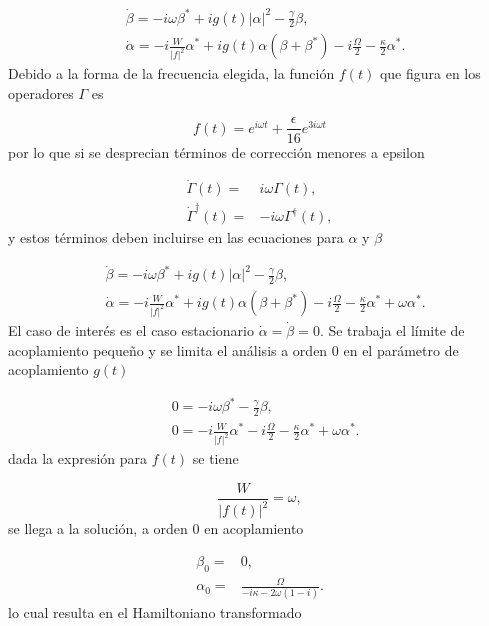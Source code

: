 \documentclass[10pt,a4paper]{report}
\begin{document}
\begin{align}
&\dot{\beta} = -i\omega\beta^* + ig(t)|\alpha|^2 - \frac{\gamma}{2}\beta,\\
&\dot{\alpha} = -i \frac{W}{|f|^2}\alpha^* + ig(t)\alpha(\beta + \beta^*) -i \frac{\Omega}{2} - \frac{\kappa}{2}\alpha^*.
\end{align} Debido a la forma de la frecuencia elegida, la función $f(t)$ que figura en los operadores $\Gamma$ es

\begin{equation}
f(t) = e^{i\omega t} + \frac{\epsilon}{16}e^{3i\omega t}
\end{equation} por lo que si se desprecian términos de corrección menores a epsilon

\begin{align}
\dot{\Gamma}(t) =& i\omega \Gamma(t),\\
\dot{\Gamma}^\dagger(t) =& -i\omega \Gamma^\dagger(t),
\end{align} y estos términos deben incluirse en las ecuaciones para $\alpha$ y $\beta$

\begin{align}
&\dot{\beta} = -i\omega\beta^* + ig(t)|\alpha|^2 - \frac{\gamma}{2}\beta,\\
&\dot{\alpha} = -i \frac{W}{|f|^2}\alpha^* + ig(t)\alpha(\beta + \beta^*) -i \frac{\Omega}{2} - \frac{\kappa}{2}\alpha^* + \omega\alpha^*.
\end{align} El caso de interés es el caso estacionario $\dot{\alpha}=\dot{\beta} = 0$. Se trabaja el límite de acoplamiento pequeño y se limita el análisis a orden 0 en el parámetro de acoplamiento $g(t)$

\begin{align}
&0 = -i\omega\beta^* - \frac{\gamma}{2}\beta,\\
&0 = -i \frac{W}{|f|^2}\alpha^* -i \frac{\Omega}{2} - \frac{\kappa}{2}\alpha^* + \omega\alpha^*.
\end{align} dada la expresión para $f(t)$ se tiene

\begin{equation}
\frac{W}{|f(t)|^2} = \omega,
\end{equation} se llega a la solución, a orden 0 en acoplamiento

\begin{align}
\beta_0 =& 0, \\
\alpha_0 =& \frac{\Omega}{-i\kappa - 2\omega(1-i)}.
\end{align} lo cual resulta en el Hamiltoniano transformado
\end{document}
